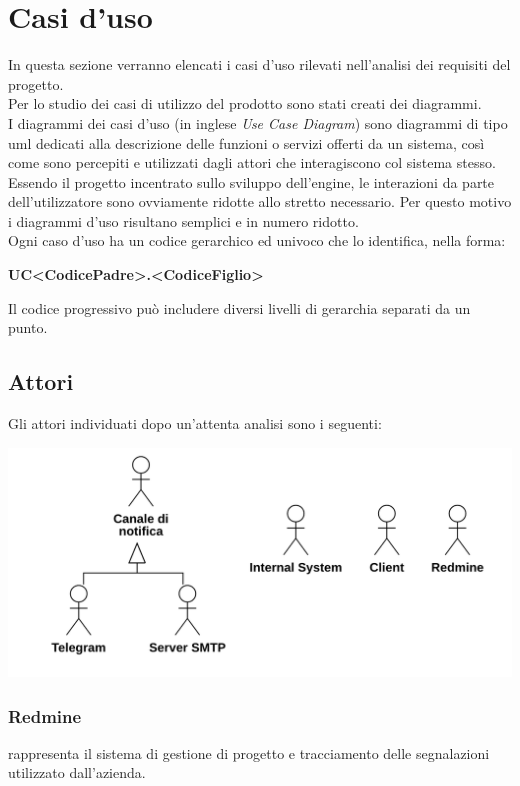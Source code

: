 \section{Casi d'uso}

In questa sezione verranno elencati i casi d'uso rilevati nell'analisi dei requisiti del progetto.\\
Per lo studio dei casi di utilizzo del prodotto sono stati creati dei diagrammi.\\
I diagrammi dei casi d'uso (in inglese \emph{Use Case Diagram}) sono diagrammi di tipo \gls{uml} dedicati alla descrizione delle funzioni o servizi offerti da un sistema, così come sono percepiti e utilizzati dagli attori che interagiscono col sistema stesso.
Essendo il progetto incentrato sullo sviluppo dell'engine, le interazioni da parte dell'utilizzatore sono ovviamente ridotte allo stretto necessario. Per questo motivo i diagrammi d'uso risultano semplici e in numero ridotto.\\

\noindent Ogni caso d’uso ha un codice gerarchico ed univoco che lo identifica, nella forma:
\begin{center}
	\textbf{UC<CodicePadre>.<CodiceFiglio>}
\end{center}
Il codice progressivo può includere diversi livelli di gerarchia separati da un punto.

\subsection{Attori}
Gli attori individuati dopo un’attenta analisi sono i seguenti:


\begin{center}
	\includegraphics[keepaspectratio = true, width=15cm]{immagini/actors.png}
\end{center}

\subsubsection{Redmine}
 rappresenta il sistema di gestione di progetto e tracciamento delle segnalazioni utilizzato dall'azienda.
